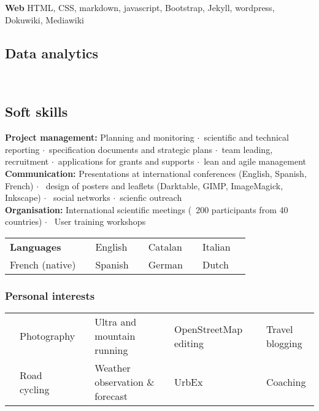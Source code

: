 \documentclass[svgnames]{article}
\newcommand{\fourstar}{\footnotesize \textcolor{CVorange}{\faStar\faStar\faStar\faStar}}
\newcommand{\threestar}{\footnotesize \textcolor{CVorange}{\faStar\faStar\faStar}\faStarO}
\newcommand{\twostar}{\footnotesize \textcolor{CVorange}{\faStar\faStar}\faStarO\faStarO}
\newcommand{\onestar}{\footnotesize \textcolor{CVorange}{\faStar}\faStarO\faStarO\faStarO}
\newcommand{\halfstar}{\footnotesize \textcolor{CVorange}{\faStarHalfO}\faStarO\faStarO\faStarO}
\newcommand{\sepa}{$\cdot$~}
\begin{document}
\noindent \textbf{Web} HTML, CSS, markdown, javascript, Bootstrap, Jekyll, wordpress, Dokuwiki, Mediawiki

\subsection*{Data analytics}

     \\ 
    


\subsection*{Soft skills}
\textbf{Project management:} Planning and monitoring \sepa scientific and technical reporting \sepa specification documents and strategic plans \sepa team leading, recruitment \sepa applications for grants and supports \sepa lean and agile management\\
\textbf{Communication:} Presentations at international conferences (English, Spanish, French) $\cdot$~ design of posters and leaflets (Darktable, GIMP, ImageMagick, Inkscape) $\cdot$~ social networks \sepa scienfic outreach\\ 
\textbf{Organisation:} International scientific meetings (~200 participants from 40 countries) $\cdot$~ User	 training workshops\\
\begin{tabularx}{\textwidth}{@{}lrlrlrlr @{}}
\textbf{Languages }	& \dotfill	 	& English 	& \threestar 	& Catalan 	& \twostar	& Italian	& \onestar\\
French (native)		& \fourstar 	& Spanish	& \threestar	& German	& \onestar	& Dutch 	& \halfstar	\\			
\end{tabularx}

\subsubsection*{Personal interests}

\begin{tabular}{rlrlrlrl}
\faCameraRetro	& Photography & \faMapSigns & Ultra and mountain running 		& \faMapMarker & OpenStreetMap editing	& \faWordpress &Travel blogging \\
\Bicycle		& Road cycling& \faCloud 	 & Weather observation \& forecast	& \Industry    & UrbEx 					& & Coaching  			\\
\end{tabular}
	
\end{document}
